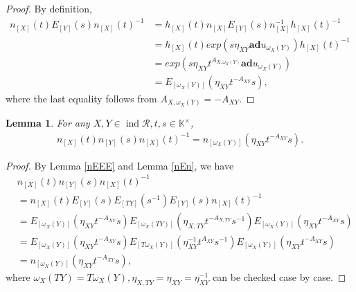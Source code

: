 \documentclass[12pt]{amsart}
\newtheorem{lemma}[theorem]{Lemma}
\begin{document}
\begin{proof}
    By definition, 
    \begin{align*}
        n_{[X]}(t) E_{[Y]}(s) n_{[X]}(t)^{-1} &= h_{[X]}(t) n_{[X]} E_{[Y]}(s) n_{[X]}^{-1} h_{[X]}(t)^{-1} \\
            &= h_{[X]}(t)  exp(s \eta_{XY} \mathbf{ad} u_{\omega_X(Y)})  h_{[X]}(t)^{-1} \\
            &= exp(s \eta_{XY}t^{A_{X,\omega_X(Y)}} \mathbf{ad}  u_{\omega_X(Y)})  \\
            &= E_{[\omega_X(Y)]}(\eta_{XY}t^{-A_{XY}}s),
    \end{align*}
    where the last equality follows from $A_{X,\omega_X(Y)} = -A_{XY}$.
\end{proof}


\begin{lemma} \label{nnn}
    For any $X,Y \in \operatorname{ind}\mathcal{R},  t,s \in \mathbb{K}^{\times}$,
    \begin{align*}
        n_{[X]}(t) n_{[Y]}(s) n_{[X]}(t)^{-1} = n_{[\omega_X(Y)]}(\eta_{XY}t^{-A_{XY}}s) .
    \end{align*}
\end{lemma}


\begin{proof}
   By Lemma \ref{nEEE} and Lemma \ref{nEn}, we have 
    \begin{align*}
        &n_{[X]}(t) n_{[Y]}(s) n_{[X]}(t)^{-1} \\
        &= n_{[X]}(t) E_{[Y]}(s) E_{[TY]}(s^{-1}) E_{[Y]}(s) n_{[X]}(t)^{-1} \\
              &=  E_{[\omega_X(Y)]}(\eta_{XY}t^{-A_{XY}}s) E_{[\omega_X(TY)]}(\eta_{X,TY}t^{-A_{X,TY}}s^{-1}) E_{[\omega_X(Y)]}(\eta_{XY}t^{-A_{XY}}s) \\
              &= E_{[\omega_X(Y)]}(\eta_{XY}t^{-A_{XY}}s) E_{[T\omega_X(Y)]}(\eta_{XY}^{-1}t^{A_{XY}}s^{-1}) E_{[\omega_X(Y)]}(\eta_{XY}t^{-A_{XY}}s) \\
              &= n_{[\omega_X(Y)]}(\eta_{XY}t^{-A_{XY}}s),
    \end{align*}
    where $\omega_X(TY) = T\omega_X(Y), \eta_{X,TY} = \eta_{XY} = \eta_{XY}^{-1}$ can be checked case by case.
\end{proof}
\end{document}
